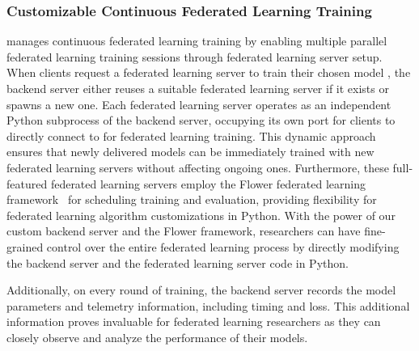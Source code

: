 \subsubsection{Customizable Continuous Federated Learning Training}
\fedkit manages continuous federated learning training by enabling multiple
parallel federated learning training sessions through federated learning server
setup.
When clients request a federated learning server to train their chosen model
\model{},
the backend server either reuses a suitable federated learning server \fs{}
if it exists or spawns a new one.
Each federated learning server operates as an independent Python subprocess of
the backend server,
occupying its own port for clients to directly connect to for federated learning
training.
This dynamic approach ensures that newly delivered models can be immediately
trained with new federated learning servers without affecting ongoing ones.
Furthermore,
these full-featured federated learning servers employ the Flower federated
learning framework~\cite{beutel2020flower}
for scheduling training and evaluation,
providing flexibility for federated learning algorithm customizations in Python.
With the power of our custom backend server and the Flower framework,
researchers can have fine-grained control over the entire federated learning
process by directly modifying the backend server and the federated learning
server code in Python.

Additionally, on every round of training,
the backend server records the model parameters and telemetry information,
including timing and loss.
This additional information proves invaluable for federated learning researchers
as they can closely observe and analyze the performance of their models.
